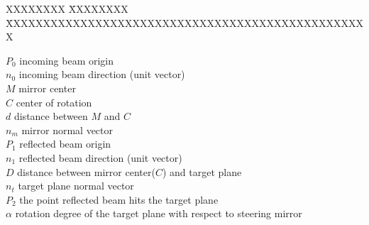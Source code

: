 \label{ch:symbole}

\begin{tabbing}
XXXXXXXX \= XXXXXXXX \= XXXXXXXXXXXXXXXXXXXXXXXXXXXXXXXXXXXXXXXXXXXXXXXXX \kill

$P_{0}$                     \> incoming beam origin \\
$n_{0}$                     \> incoming beam direction (unit vector) \\
$M$                         \> mirror center \\
$C$                         \> center of rotation \\
$d$                         \> distance between $M$ and $C$ \\
$n_{m}$                     \> mirror normal vector \\
$P_{1}$                     \> reflected beam origin \\
$n_{1}$                     \> reflected beam direction (unit vector) \\
$D$                         \> distance between mirror center($C$) and target plane \\
$n_{t}$                     \> target plane normal vector \\
$P_{2}$                     \> the point reflected beam hits the target plane \\
$\alpha$                    \> rotation degree of the target plane with respect to steering mirror \\


\end{tabbing}

